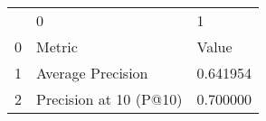 \begin{tabular}{lll}
 & 0 & 1 \\
0 & Metric & Value \\
1 & Average Precision & 0.641954 \\
2 & Precision at 10 (P@10) & 0.700000 \\
\end{tabular}
